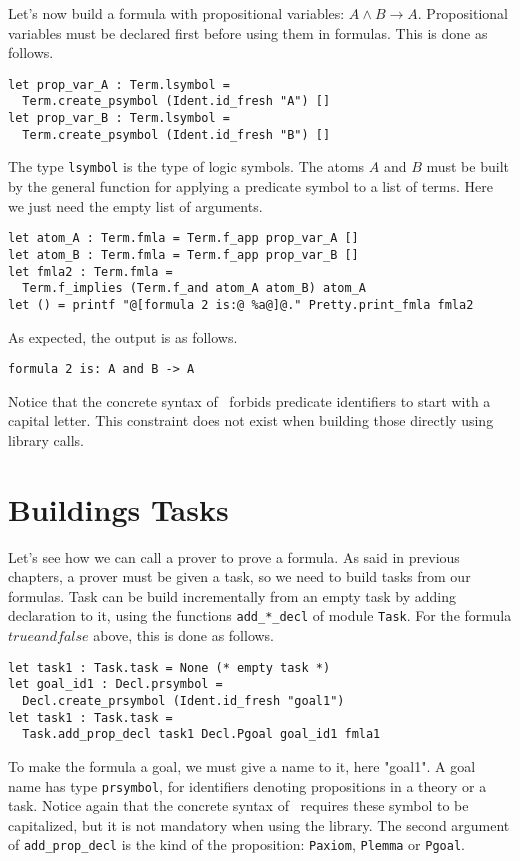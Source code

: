Let's now build a formula with propositional variables: $A \land B
\rightarrow A$. Propositional variables must be declared first before
using them in formulas. This is done as follows.
\begin{verbatim}
let prop_var_A : Term.lsymbol = 
  Term.create_psymbol (Ident.id_fresh "A") []
let prop_var_B : Term.lsymbol = 
  Term.create_psymbol (Ident.id_fresh "B") []
\end{verbatim}
The type \texttt{lsymbol} is the type of logic symbols. The atoms $A$ and $B$
must be built by the general function for applying a predicate symbol to a list of terms. Here we just need the empty list of arguments.
\begin{verbatim}
let atom_A : Term.fmla = Term.f_app prop_var_A []
let atom_B : Term.fmla = Term.f_app prop_var_B []
let fmla2 : Term.fmla = 
  Term.f_implies (Term.f_and atom_A atom_B) atom_A
let () = printf "@[formula 2 is:@ %a@]@." Pretty.print_fmla fmla2
\end{verbatim}

As expected, the output is as follows.
\begin{verbatim}
formula 2 is: A and B -> A
\end{verbatim}
Notice that the concrete syntax of \why\ forbids predicate identifiers
to start with a capital letter. This constraint does not exist when
building those directly using library calls.

\section{Buildings Tasks}

Let's see how we can call a prover to prove a formula. As said in
previous chapters, a prover must be given a task, so we need to build
tasks from our formulas. Task can be build incrementally from an empty
task by adding declaration to it, using the functions
\texttt{add\_*\_decl} of module \texttt{Task}. For the formula $true and
false$ above, this is done as follows.
\begin{verbatim}
let task1 : Task.task = None (* empty task *)
let goal_id1 : Decl.prsymbol = 
  Decl.create_prsymbol (Ident.id_fresh "goal1") 
let task1 : Task.task = 
  Task.add_prop_decl task1 Decl.Pgoal goal_id1 fmla1
\end{verbatim}
To make the formula a goal, we must give a name to it, here "goal1". A
goal name has type \texttt{prsymbol}, for identifiers denoting
propositions in a theory or a task. Notice again that the concrete
syntax of \why\ requires these symbol to be capitalized, but it is not
mandatory when using the library. The second argument of
\texttt{add\_prop\_decl} is the kind of the proposition:
\texttt{Paxiom}, \texttt{Plemma} or \texttt{Pgoal}.


